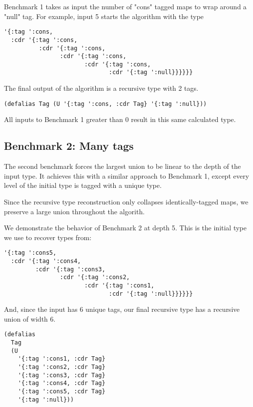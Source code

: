 Benchmark 1 takes as input the number of "cons" tagged maps to wrap
around a "null" tag. For example, input 5 starts the algorithm with
the type

\begin{verbatim}
'{:tag ':cons,
  :cdr '{:tag ':cons,
          :cdr '{:tag ':cons,
                :cdr '{:tag ':cons, 
                       :cdr '{:tag ':cons, 
                              :cdr '{:tag ':null}}}}}}
\end{verbatim}

The final output of the algorithm is a recursive type with 2 tags.

\begin{verbatim}
(defalias Tag (U '{:tag ':cons, :cdr Tag} '{:tag ':null}))
\end{verbatim}

All inputs to Benchmark 1 greater than 0 result in this same calculated type.

\subsection{Benchmark 2: Many tags}

The second benchmark forces the largest union to be linear to the depth
of the input type. It achieves this with a similar approach to Benchmark 1,
except every level of the initial type is tagged with a unique type.

Since the recursive type reconstruction only collapses identically-tagged
maps, we preserve a large union throughout the algorith.

We demonstrate the behavior of Benchmark 2 at depth 5. This is the initial
type we use to recover types from:

\begin{verbatim}
'{:tag ':cons5,
  :cdr '{:tag ':cons4,
         :cdr '{:tag ':cons3,
                :cdr '{:tag ':cons2, 
                       :cdr '{:tag ':cons1,
                              :cdr '{:tag ':null}}}}}}
\end{verbatim}

And, since the input has 6 unique tags, our final recursive type has a
recursive union of width 6.

\begin{verbatim}
(defalias
  Tag
  (U
    '{:tag ':cons1, :cdr Tag}
    '{:tag ':cons2, :cdr Tag}
    '{:tag ':cons3, :cdr Tag}
    '{:tag ':cons4, :cdr Tag}
    '{:tag ':cons5, :cdr Tag}
    '{:tag ':null}))
\end{verbatim}

